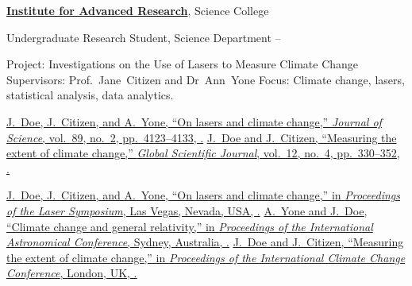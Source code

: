 \documentclass[letterpaper,MMMyyyy,nonstopmode]{./simple-resume-cv-master/simpleresumecv}
\begin{document}
\begin{Body}
\Entry
\href{http://www.example.com/my-institute}
{\textbf{Institute for Advanced Research}},
Science College

\Gap
\BulletItem
	Undergraduate Research Student, Science Department
	\hfill
	 --
\begin{Detail}
	\SubBulletItem
		Project:
		Investigations on the Use of Lasers to Measure Climate Change
	\SubBulletItem
		Supervisors:
		Prof.~Jane~Citizen and
		Dr~Ann~Yone
	\SubBulletItem
		Focus:
		Climate change, lasers, statistical analysis, data analytics.
\end{Detail}


\begingroup
	\renewcommand{\MaxNumberedItem}{[88]}
	\Gap
	\NumberedItem{[10]}
	\href{http://www.example.com/my-paper-doi-5}
	{\underline{J.~Doe}, J.~Citizen, and A.~Yone,
	``On lasers and climate change,''
	\textit{Journal of Science},
	vol.~89,
	no.~2,
	pp.~4123--4133,
	.}
	\Gap
	\NumberedItem{[1]}
	\href{http://www.example.com/my-paper-doi-4}
	{\underline{J.~Doe} and J.~Citizen,
	``Measuring the extent of climate change,''
	\textit{Global Scientific Journal},
	vol.~12,
	no.~4,
	pp.~330--352,
	.}
\endgroup

\BigGap
{}

\begingroup
	\renewcommand{\MaxNumberedItem}{[8888]}
	\Gap
	\NumberedItem{[1000]}
	\href{http://www.example.com/my-paper-doi-3}
	{\underline{J.~Doe}, J.~Citizen, and A.~Yone,
	``On lasers and climate change,''
	in \textit{Proceedings of the Laser Symposium},
	Las Vegas, Nevada, USA,
	.}
	\Gap
	\NumberedItem{[100]}
	\href{http://www.example.com/my-paper-doi-2}
	{A.~Yone and \underline{J.~Doe},
	``Climate change and general relativity,''
	in \textit{Proceedings of the International Astronomical Conference},
	Sydney, Australia,
	.}
	\Gap
	\NumberedItem{[10]}
	\href{http://www.example.com/my-paper-doi-1}
	{\underline{J.~Doe} and J.~Citizen,
	``Measuring the extent of climate change,''
	in \textit{Proceedings of the International Climate Change Conference},
	London, UK,
	.}
\endgroup


\end{Body}
\end{document}
